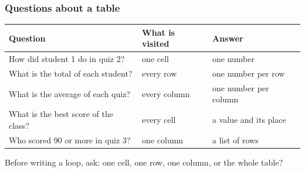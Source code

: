 \documentclass[aspectratio=169,10pt,compress]{beamer}
\begin{document}
\begin{frame}[t,fragile] \frametitle{Questions about a table}


\begin{table}
		\small
		\begin{tabular}{@{}L{0.42\textwidth}L{0.22\textwidth}L{0.28\textwidth}@{}}
			\toprule
			\textbf{Question} & \textbf{What is visited} & \textbf{Answer} \\
			\midrule
			How did student 1 do in quiz 2?          & one cell        & one number \\
			What is the total of each student?       & every row       & one number per row \\
			What is the average of each quiz?        & every column    & one number per column \\
			What is the best score of the class?     & every cell      & a value and its place \\
			Who scored 90 or more in quiz 3?         & one column      & a list of rows \\
			\bottomrule
		\end{tabular}
\end{table}%


	\vspace{0.5em}
	\small Before writing a loop, ask: one cell, one row, one column, or the whole table?
\end{frame}




\end{document}
